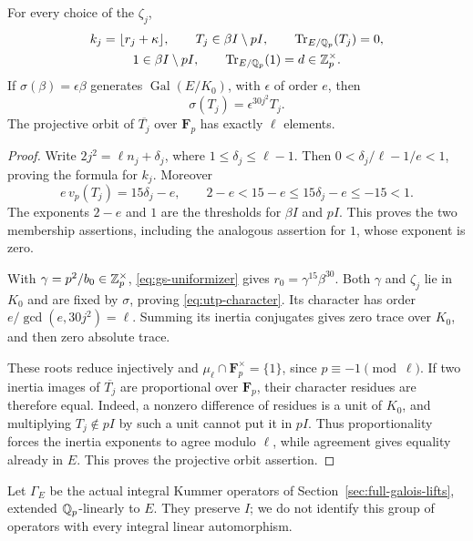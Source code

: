 \begin{lemma}
\label{lem:utp-content}
For every choice of the $\zeta_j$,
\begin{equation}\label{eq:utp-content}
 \begin{gathered}
 k_j=\lfloor r_j+\kappa\rfloor,\qquad
 T_j\in\beta I\setminus pI,\qquad
 \operatorname{Tr}_{E/\mathbb Q_p}(T_j)=0,\\
 1\in\beta I\setminus pI,\qquad
 \operatorname{Tr}_{E/\mathbb Q_p}(1)=d\in\mathbb Z_p^\times .
 \end{gathered}
\end{equation}
If $\sigma(\beta)=\epsilon\beta$ generates
$\operatorname{Gal}(E/K_0)$, with $\epsilon$ of order $e$, then
\begin{equation}\label{eq:utp-character}
                         \sigma(T_j)=\epsilon^{30j^2}T_j .
\end{equation}
The projective orbit of $\overline{T_j}$ over $\mathbf F_p$
has exactly $\ell$ elements.
\end{lemma}
\begin{proof}
Write $2j^2=\ell n_j+\delta_j$, where
$1\le\delta_j\le\ell-1$. Then
$0<\delta_j/\ell-1/e<1$, proving the formula for $k_j$.
Moreover
\[
 e\,v_p(T_j)=15\delta_j-e,\qquad
 2-e<15-e\le15\delta_j-e\le-15<1 .
\]
The exponents $2-e$ and $1$ are the thresholds for $\beta I$
and $pI$. This proves the two membership assertions, including
the analogous assertion for $1$, whose exponent is zero.

With $\gamma=p^2/b_0\in\mathbb Z_p^\times$,
\eqref{eq:gs-uniformizer} gives $r_0=\gamma^{15}\beta^{30}$.
Both $\gamma$ and $\zeta_j$ lie in $K_0$ and are fixed by
$\sigma$, proving \eqref{eq:utp-character}. Its character
has order
$e/\gcd(e,30j^2)=\ell$. Summing its inertia conjugates gives
zero trace over $K_0$, and then zero absolute trace.

These roots reduce injectively and
$\mu_\ell\cap\mathbf F_p^\times=\{1\}$, since
$p\equiv-1\pmod\ell$. If two inertia images of
$\overline{T_j}$ are proportional over $\mathbf F_p$,
their character residues are therefore equal. Indeed, a
nonzero difference of residues is a unit of $K_0$, and
multiplying $T_j\notin pI$ by such a unit cannot put it in
$pI$. Thus proportionality forces the inertia exponents
to agree modulo $\ell$, while agreement gives equality
already in $E$. This proves the projective orbit assertion.
\end{proof}

Let $\Gamma_E$ be the actual integral Kummer operators of
Section~\ref{sec:full-galois-lifts}, extended $\mathbb Q_p$-linearly
to $E$. They preserve $I$; we do not identify this group of
operators with every integral linear automorphism.


